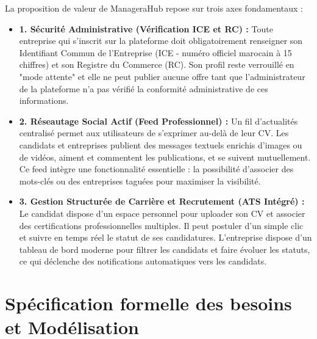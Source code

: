 La proposition de valeur de ManageraHub repose sur trois axes fondamentaux :
\begin{itemize}
    \item \textbf{1. Sécurité Administrative (Vérification ICE et RC) :} Toute entreprise qui s'inscrit sur la plateforme doit obligatoirement renseigner son Identifiant Commun de l'Entreprise (ICE - numéro officiel marocain à 15 chiffres) et son Registre du Commerce (RC). Son profil reste verrouillé en "mode attente" et elle ne peut publier aucune offre tant que l'administrateur de la plateforme n'a pas vérifié la conformité administrative de ces informations.
    \item \textbf{2. Réseautage Social Actif (Feed Professionnel) :} Un fil d'actualités centralisé permet aux utilisateurs de s'exprimer au-delà de leur CV. Les candidats et entreprises publient des messages textuels enrichis d'images ou de vidéos, aiment et commentent les publications, et se suivent mutuellement. Ce feed intègre une fonctionnalité essentielle : la possibilité d'associer des mots-clés ou des entreprises taguées pour maximiser la visibilité.
    \item \textbf{3. Gestion Structurée de Carrière et Recrutement (ATS Intégré) :} Le candidat dispose d'un espace personnel pour uploader son CV et associer des certifications professionnelles multiples. Il peut postuler d'un simple clic et suivre en temps réel le statut de ses candidatures. L'entreprise dispose d'un tableau de bord moderne pour filtrer les candidats et faire évoluer les statuts, ce qui déclenche des notifications automatiques vers les candidats.
\end{itemize}

\section{Spécification formelle des besoins et Modélisation}
